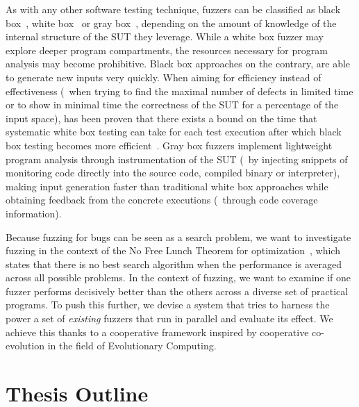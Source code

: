 As with any other software testing technique, fuzzers can be classified as black
box~\cite{hocevar2011zzuf, helin2015radamsa, householder2012probability,
woo2013scheduling}, white box~\cite{godefroid2012sage, stephens2016driller} or
gray box~\cite{bohme2017coverage, bohme2017directed, afl}, depending on the
amount of knowledge of the internal structure of the \ac{SUT} they leverage.
While a white box fuzzer may explore deeper program compartments, the resources
necessary for program analysis may become prohibitive. Black box approaches on
the contrary, are able to generate new inputs very quickly. When aiming for
efficiency instead of effectiveness (\eg~when trying to find the maximal number
of defects in limited time or to show in minimal time the correctness of the
\ac{SUT} for a percentage of the input space), has been proven that there exists
a bound on the time that systematic white box testing can take for each test
execution after which black box testing becomes more
efficient~\cite{bohme2016probabilistic}. Gray box fuzzers implement lightweight
program analysis through instrumentation of the \ac{SUT} (\eg~by injecting
snippets of monitoring code directly into the source code, compiled binary or
interpreter), making input generation faster than traditional white box
approaches while obtaining feedback from the concrete executions (\eg~through
code coverage information).


Because fuzzing for bugs can be seen as a search problem, we want to investigate
fuzzing in the context of the No Free Lunch Theorem for
optimization~\cite{wolpert1997no}, which states that there is no best search
algorithm when the performance is averaged across all possible problems. In the
context of fuzzing, we want to examine if one fuzzer performs decisively better
than the others across a diverse set of practical programs. To push this
further, we devise a system that tries to harness the power a set of
\emph{existing} fuzzers that run in parallel and evaluate its effect. We achieve
this thanks to a cooperative framework inspired by cooperative co-evolution in
the field of Evolutionary Computing.


\section{Thesis Outline}

